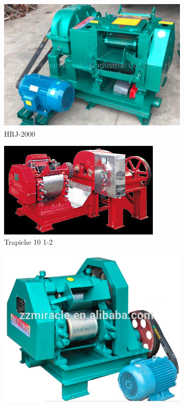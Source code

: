 \documentclass{article}%
\begin{document}
\begin{figure}[h!]%
\begin{subfigure}{0.33\linewidth}%
\includegraphics[width=0.95\linewidth]{Molinos/HRJ-2000.jpg}%
\caption{HRJ{-}2000}%
\end{subfigure}%
\begin{subfigure}{0.33\linewidth}%
\includegraphics[width=0.95\linewidth]{Molinos/Trapiche 10 1-2.jpg}%
\caption{Trapiche 10 1{-}2}%
\end{subfigure}%
\begin{subfigure}{0.33\linewidth}%
\includegraphics[width=0.95\linewidth]{Molinos/MRC-EB2.jpg}%

\end{subfigure}
\end{figure}
\end{document}
